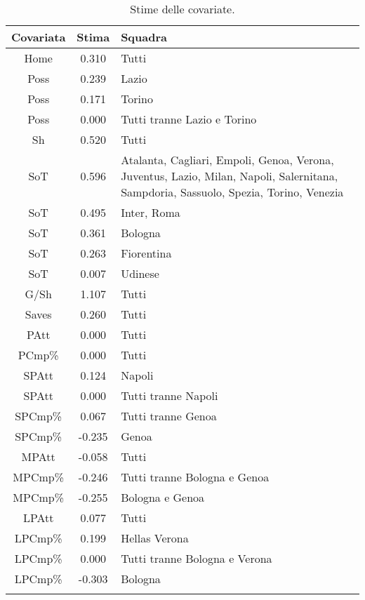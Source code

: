 \begin{table}[]%
	
	\renewcommand{\arraystretch}{1.7}
	\centering
	\begin{tabular}{ccp{10cm}}
		\hline	
		
		\textbf{Covariata} & \textbf{Stima} & \textbf{Squadra} \\	
		\hline
		Home & 0.310 & Tutti\\
		Poss & 0.239 & Lazio \\
		Poss & 0.171 & Torino\\
		Poss & 0.000 & Tutti tranne Lazio e Torino\\
		Sh & 0.520 & Tutti \\
		SoT & 0.596 & Atalanta, Cagliari, Empoli, Genoa, Verona, Juventus, Lazio, Milan, Napoli, Salernitana, Sampdoria, Sassuolo, Spezia, Torino, Venezia\\
		SoT & 0.495 & Inter, Roma \\
		SoT & 0.361 & Bologna \\
		SoT & 0.263 & Fiorentina\\
		SoT & 0.007 & Udinese \\
		G/Sh & 1.107 & Tutti \\
		Saves & 0.260 & Tutti \\
		PAtt & 0.000 & Tutti \\
		PCmp\% & 0.000 & Tutti \\
		SPAtt & 0.124 & Napoli \\
		SPAtt & 0.000 & Tutti tranne Napoli \\
		SPCmp\% & 0.067 & Tutti tranne Genoa \\ 
		SPCmp\% & -0.235 & Genoa \\	
		MPAtt & -0.058 & Tutti \\ 
		MPCmp\% & -0.246 & Tutti tranne Bologna e Genoa \\
		MPCmp\% & -0.255 & Bologna e Genoa \\
		LPAtt & 0.077 & Tutti \\
		LPCmp\% & 0.199 & Hellas Verona \\
		LPCmp\% & 0.000 & Tutti tranne Bologna e Verona \\
		LPCmp\% & -0.303 & Bologna \\	     		   		    
		\hline
		& &  \\
		
	\end{tabular} \hbox{}
	\caption{Stime delle covariate.} \label{tab:BTCL2} 
	
\end{table}
